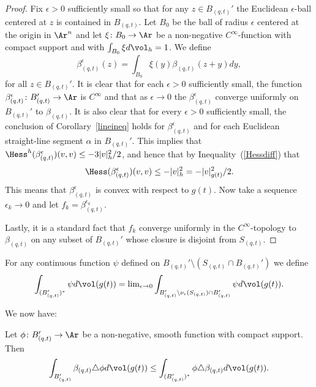 \begin{proof}
Fix $\epsilon>0$ sufficiently small so that for any $z\in
B_{(q,t)}'$ the Euclidean $\epsilon$-ball centered at $z$ is
contained in $B_{(q,t)}$. Let $B_0$ be the ball of radius $\epsilon$
centered at the origin in $\Ar^n$ and let $\xi\colon B_0\to \Ar$ be
a non-negative $C^\infty$-function with compact support and with
$\int_{B_0}\xi d\vol_h=1$. We define
$$\beta_{(q,t)}^\epsilon(z)=\int_{B_0}\xi(y)\beta_{(q,t)}(z+y)dy,$$
for all $z\in B_{(q,t)}'$. It is clear that for each $\epsilon>0$
sufficiently small, the function $\beta_{(q,t)}^\epsilon\colon
B_{(q,t)}'\to \Ar$ is $C^\infty$ and that as $\epsilon\rightarrow 0$
the $\beta_{(q,t)}^\epsilon$ converge uniformly on $B_{(q,t)}'$ to
$\beta_{(q,t)}$. It is also clear that for every $\epsilon>0$
sufficiently small, the conclusion of Corollary~\ref{lineineq} holds
for $\beta_{(q,t)}^\epsilon$ and for each Euclidean straight-line
segment $\alpha$ in $B_{(q,t)}'$. This implies that $\Hess^h(\beta_{(q,t)}^\epsilon)(v,v)\le -3|v|_h^2/2$, and hence that
by Inequality~(\ref{Hessdiff}) that
$$\Hess(\beta_{(q,t)}^\epsilon)(v,v)\le -|v|^2_h=-|v|^2_{g(t)}/2.$$
This means that $\beta_{(q,t)}^\epsilon$ is convex with respect to
$g(t)$. Now take a sequence $\epsilon_k\rightarrow 0$ and let
$f_k=\beta_{(q,t)}^{\epsilon_k}$.

Lastly, it is a standard fact that $f_k$ converge uniformly in the
$C^\infty$-topology to $\beta_{(q,t)}$ on any subset of $B_{(q,t)}'$
whose closure is disjoint from $S_{(q,t)}$.
\end{proof}

\begin{definition}
\label{def:starred-integral}
For any continuous function $\psi$ defined on $B_{(q,t)}'\setminus
\left(S_{(q,t)}\cap B_{(q,t)}'\right)$ we define
$$\int_{(B_{(q,t)}')^*}\psi d\vol(g(t))=\mathrm{lim}_{\epsilon\rightarrow
0}\int_{B_{(q,t)}'\setminus \nu_\epsilon(S_{(q,t)})\cap
B_{(q,t)}'}\psi d\vol(g(t)).$$
\end{definition}

We now have:

\begin{claim}
\label{claim:beta-weak-laplacian-inequality}
\label{wineq}
Let $\phi\colon B_{(q,t)}'\to \Ar$ be a non-negative, smooth
function with compact support. Then
$$\int_{B_{(q,t)}'}\beta_{(q,t)}\triangle \phi d\vol(g(t))\le \int_{(B_{(q,t)}')^*}\phi
\triangle \beta_{(q,t)} d\vol(g(t)).$$
\end{claim}


